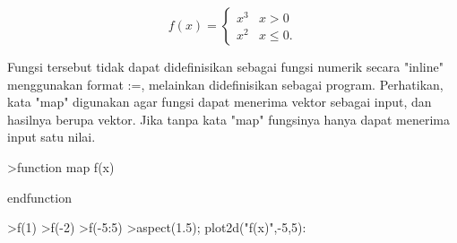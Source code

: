 \documentclass[a4paper,10pt]{article}
\begin{document}
\begin{eulernotebook}
\begin{eulercomment}
\begin{eulercomment}
\begin{eulercomment}
\begin{eulercomment}
\begin{eulercomment}
\begin{eulercomment}
\begin{eulercomment}
\begin{eulercomment}
\begin{eulercomment}
\begin{eulercomment}
\begin{eulercomment}
\begin{eulercomment}
\begin{eulercomment}
\begin{eulercomment}
\begin{eulercomment}
\begin{eulercomment}
\begin{eulercomment}
\begin{eulercomment}
\begin{eulercomment}
\begin{eulercomment}
\begin{eulercomment}
\begin{eulercomment}
\begin{eulercomment}
\begin{eulercomment}
\begin{eulercomment}
\begin{eulercomment}
\begin{eulercomment}
\begin{eulercomment}
\begin{eulercomment}
\begin{eulercomment}
\begin{eulercomment}
\begin{eulercomment}
\begin{eulercomment}
\begin{eulercomment}
\begin{eulercomment}
\begin{eulercomment}
\begin{eulercomment}
\begin{eulercomment}
\begin{eulercomment}
\begin{eulercomment}
\begin{eulercomment}
\begin{eulercomment}
\begin{eulercomment}
\begin{eulercomment}
\begin{eulercomment}
\begin{eulercomment}
\begin{eulercomment}
\begin{eulercomment}
\begin{eulercomment}
\begin{eulercomment}
\begin{eulercomment}
\begin{eulercomment}
\begin{eulercomment}
\end{eulercomment}
\begin{eulerformula}
\[
f(x) = \begin{cases} x^3 & x>0 \\ x^2 & x\le 0. \end{cases}
\]
\end{eulerformula}
\begin{eulercomment}
Fungsi tersebut tidak dapat didefinisikan sebagai fungsi numerik
secara "inline" menggunakan format :=, melainkan didefinisikan sebagai
program. Perhatikan, kata "map" digunakan agar fungsi dapat menerima
vektor sebagai input, dan hasilnya berupa vektor. Jika tanpa kata
"map" fungsinya hanya dapat menerima input satu nilai.
\end{eulercomment}
\begin{eulerprompt}
>function map f(x)
\end{eulerprompt}
\begin{eulerudf}
  endfunction
\end{eulerudf}
\begin{eulerprompt}
>f(1)
>f(-2)
>f(-5:5)
>aspect(1.5); plot2d("f(x)",-5,5):
\end{eulerprompt}

\end{eulercomment}
\end{eulercomment}
\end{eulercomment}
\end{eulercomment}
\end{eulercomment}
\end{eulercomment}
\end{eulercomment}
\end{eulercomment}
\end{eulercomment}
\end{eulercomment}
\end{eulercomment}
\end{eulercomment}
\end{eulercomment}
\end{eulercomment}
\end{eulercomment}
\end{eulercomment}
\end{eulercomment}
\end{eulercomment}
\end{eulercomment}
\end{eulercomment}
\end{eulercomment}
\end{eulercomment}
\end{eulercomment}
\end{eulercomment}
\end{eulercomment}
\end{eulercomment}
\end{eulercomment}
\end{eulercomment}
\end{eulercomment}
\end{eulercomment}
\end{eulercomment}
\end{eulercomment}
\end{eulercomment}
\end{eulercomment}
\end{eulercomment}
\end{eulercomment}
\end{eulercomment}
\end{eulercomment}
\end{eulercomment}
\end{eulercomment}
\end{eulercomment}
\end{eulercomment}
\end{eulercomment}
\end{eulercomment}
\end{eulercomment}
\end{eulercomment}
\end{eulercomment}
\end{eulercomment}
\end{eulercomment}
\end{eulercomment}
\end{eulercomment}
\end{eulercomment}
\end{eulernotebook}
\end{document}
